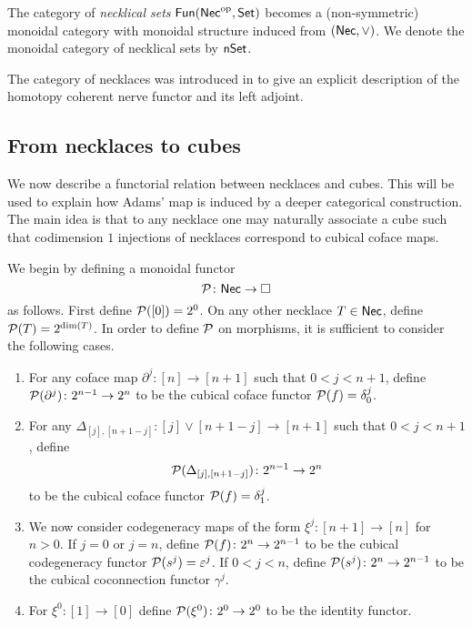 The category of \textit{necklical sets} $\mathsf{Fun}(\mathsf{Nec}^{\mathrm{op}}, \mathsf{Set})$ becomes a (non-symmetric) monoidal category with monoidal structure induced from $(\mathsf{Nec}, \vee)$.
We denote the monoidal category of necklical sets by $\mathsf{nSet}$.

\begin{remark*}
	The category of necklaces was introduced in \cite{dugger2011rigidification} to give an explicit description of the homotopy coherent nerve functor and its left adjoint.
\end{remark*}

\subsection{From necklaces to cubes}

We now describe a functorial relation between necklaces and cubes.
This will be used to explain how Adams' map is induced by a deeper categorical construction.
The main idea is that to any necklace one may naturally associate a cube such that codimension $1$ injections of necklaces correspond to cubical coface maps.

We begin by defining a monoidal functor
\[
\mathcal{P} \colon \mathsf{Nec} \to \square
\]
as follows.
First define $\mathcal{P}([0])=2^0$.
On any other necklace $T \in \mathsf{Nec}$, define $\mathcal{P}(T) = 2^{\dim(T)}$.
In order to define $\mathcal{P}$ on morphisms, it is sufficient to consider the following cases.
\begin{enumerate}
	\item For any coface map $\partial^j \colon [n] \to [n+1]$ such that $0< j<{n+1}$, define $\mathcal{P}(\partial^j) \colon 2^{n-1}\to 2^{n}$ to be the cubical coface functor $\mathcal{P}(f)= \delta_0^{j}$.

	\item For any $\Delta_{[j], [n+1-j]} \colon [j] \vee [n+1-j] \to [n+1]$ such that $0<j<n+1$, define
	\[
	\mathcal{P}(\Delta_{[j], [n+1-j]}) \colon 2^{n-1}\to 2^{n}
	\]
	to be the cubical coface functor $\mathcal{P}(f)=\delta_1^{j}$.

	\item We now consider codegeneracy maps of the form $\xi^j \colon [n+1] \to [n]$ for $n>0$.
	If $j=0$ or $j=n$, define $\mathcal{P}(f) \colon 2^n \to 2^{n-1}$ to be the cubical codegeneracy functor $\mathcal{P}(s^j)= \varepsilon^{j}$.
	If $0<j<n$, define $\mathcal{P}(s^j) \colon 2^n \to 2^{n-1}$ to be the cubical coconnection functor $\gamma^{j}$.

	\item For $\xi^0 \colon [1] \to [0]$ define $\mathcal{P}(\xi^0) \colon 2^0 \to 2^0$ to be the identity functor.
\end{enumerate}

